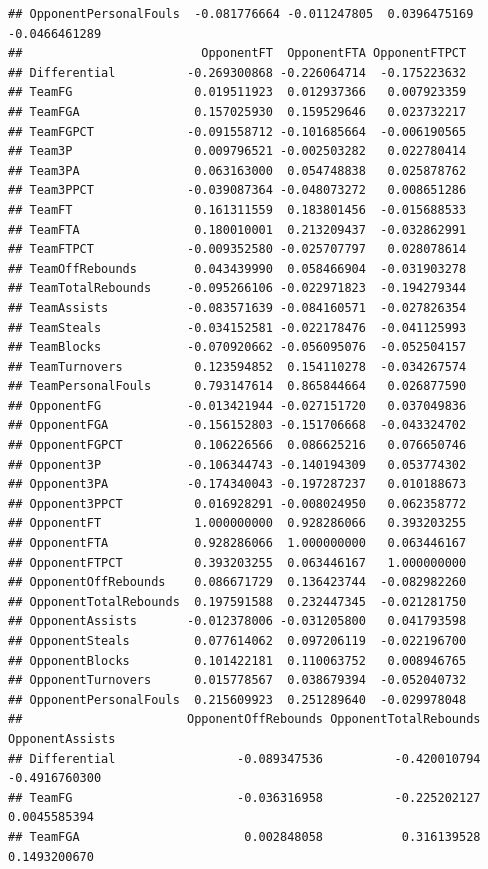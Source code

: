 \documentclass[
]{book}
\begin{document}
\begin{verbatim}
## OpponentPersonalFouls  -0.081776664 -0.011247805  0.0396475169 -0.0466461289
##                         OpponentFT  OpponentFTA OpponentFTPCT
## Differential          -0.269300868 -0.226064714  -0.175223632
## TeamFG                 0.019511923  0.012937366   0.007923359
## TeamFGA                0.157025930  0.159529646   0.023732217
## TeamFGPCT             -0.091558712 -0.101685664  -0.006190565
## Team3P                 0.009796521 -0.002503282   0.022780414
## Team3PA                0.063163000  0.054748838   0.025878762
## Team3PPCT             -0.039087364 -0.048073272   0.008651286
## TeamFT                 0.161311559  0.183801456  -0.015688533
## TeamFTA                0.180010001  0.213209437  -0.032862991
## TeamFTPCT             -0.009352580 -0.025707797   0.028078614
## TeamOffRebounds        0.043439990  0.058466904  -0.031903278
## TeamTotalRebounds     -0.095266106 -0.022971823  -0.194279344
## TeamAssists           -0.083571639 -0.084160571  -0.027826354
## TeamSteals            -0.034152581 -0.022178476  -0.041125993
## TeamBlocks            -0.070920662 -0.056095076  -0.052504157
## TeamTurnovers          0.123594852  0.154110278  -0.034267574
## TeamPersonalFouls      0.793147614  0.865844664   0.026877590
## OpponentFG            -0.013421944 -0.027151720   0.037049836
## OpponentFGA           -0.156152803 -0.151706668  -0.043324702
## OpponentFGPCT          0.106226566  0.086625216   0.076650746
## Opponent3P            -0.106344743 -0.140194309   0.053774302
## Opponent3PA           -0.174340043 -0.197287237   0.010188673
## Opponent3PPCT          0.016928291 -0.008024950   0.062358772
## OpponentFT             1.000000000  0.928286066   0.393203255
## OpponentFTA            0.928286066  1.000000000   0.063446167
## OpponentFTPCT          0.393203255  0.063446167   1.000000000
## OpponentOffRebounds    0.086671729  0.136423744  -0.082982260
## OpponentTotalRebounds  0.197591588  0.232447345  -0.021281750
## OpponentAssists       -0.012378006 -0.031205800   0.041793598
## OpponentSteals         0.077614062  0.097206119  -0.022196700
## OpponentBlocks         0.101422181  0.110063752   0.008946765
## OpponentTurnovers      0.015778567  0.038679394  -0.052040732
## OpponentPersonalFouls  0.215609923  0.251289640  -0.029978048
##                       OpponentOffRebounds OpponentTotalRebounds OpponentAssists
## Differential                 -0.089347536          -0.420010794   -0.4916760300
## TeamFG                       -0.036316958          -0.225202127    0.0045585394
## TeamFGA                       0.002848058           0.316139528    0.1493200670

\end{verbatim}
\end{document}
